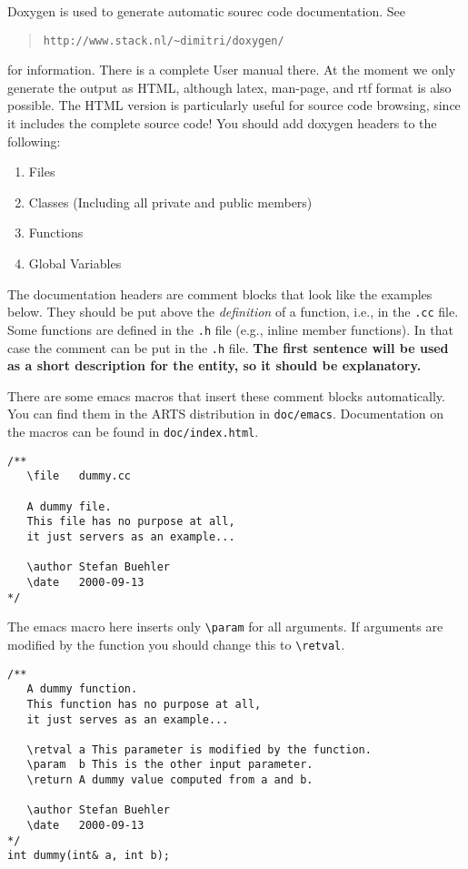 Doxygen is used to generate automatic sourec code documentation. See
\begin{quote}
  \verb|http://www.stack.nl/~dimitri/doxygen/|
\end{quote}
for information. There is a complete User manual there. At the moment
we only generate the output as HTML, although latex, man-page, and rtf
format is also possible. The HTML version is particularly useful for
source code browsing, since it includes the complete source code! You
should add doxygen headers to the following:

\begin{enumerate}
\item Files
\item Classes (Including all private and public members)
\item Functions
\item Global Variables
\end{enumerate}

The documentation headers are comment blocks that look like the
examples below. They should be put above the \emph{definition} of a
function, i.e., in the \verb|.cc| file.  Some functions are defined in
the \verb|.h| file (e.g., inline member functions). In that case the
comment can be put in the \verb|.h| file.  \textbf{The first sentence
  will be used as a short description for the entity, so it should be
  explanatory.}

There are some emacs macros that insert these comment blocks
automatically. You can find them in the ARTS distribution in
\verb|doc/emacs|. Documentation on the macros can be found in
\verb|doc/index.html|. 

\begin{verbatim}
/**
   \file   dummy.cc

   A dummy file.
   This file has no purpose at all,
   it just servers as an example... 
  
   \author Stefan Buehler
   \date   2000-09-13
*/    
\end{verbatim}


The emacs macro here inserts only \verb|\param| for all
arguments. If arguments are modified by the function you should
change this to \verb|\retval|.

\begin{verbatim}
/** 
   A dummy function.
   This function has no purpose at all,
   it just serves as an example...

   \retval a This parameter is modified by the function.
   \param  b This is the other input parameter.
   \return A dummy value computed from a and b.

   \author Stefan Buehler
   \date   2000-09-13
*/
int dummy(int& a, int b);
\end{verbatim}




